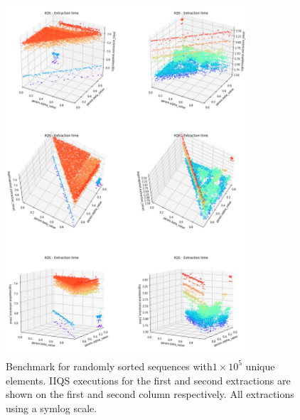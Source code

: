 \begin{figure}[!ht]
    \centering
    \includegraphics[width=0.8\textwidth]{./fragments/04_experimental_execution/images/04_alphabeta_singleclass.png}
    \caption{Benchmark for randomly sorted sequences with$1\times10^5$ unique elements. IIQS executions for the first and second extractions are shown on the first and second column respectively. All extractions using a symlog scale.}
    \label{FIG:05_ALPHABETA_RELATIONSHIP_RANDOM}
\end{figure}

